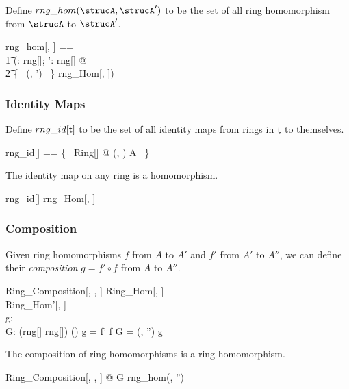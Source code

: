 \documentclass{amsart}
\begin{document}
Define $rng\_hom(\strucA, \strucA')$ to be the set of all ring homomorphism from $\strucA$ to $\strucA'$.

\begin{zed}
	rng\_hom[\genT, \genU] == \\
	\t1	(\lambda \strucA: rng[\genT]; \strucA': rng[\genU] @ \\
	\t2		\{~ (\strucA, \strucA') ~\} \dres rng\_Hom[\genT, \genU])
\end{zed}

\subsubsection{Identity Maps}

Define $rng\_id[\mathsf{t}]$ to be the set of all identity maps from rings in $\mathsf{t}$ to themselves.

\begin{zed}
	rng\_id[\genT] == \{~ Ring[\genT] @ (\strucA, \strucA) \mapsto \id A ~\}
\end{zed}

\begin{remark}
	The identity map on any ring is a homomorphism.
	
\begin{zed}
	rng\_id[\setT] \subseteq rng\_Hom[\setT, \setT]
\end{zed}

\end{remark}

\subsubsection{Composition}

Given ring homomorphisms $f$ from $A$ to $A'$ and $f'$ from $A'$ to $A''$,
we can define their \textit{composition} $g = f' \circ f$ from $A$ to $A''$.

\begin{schema}{Ring\_Composition}[\genT, \genU, \genV]
	Ring\_Hom[\genT, \genU] \\
	Ring\_Hom'[\genU, \genV] \\
	g: \genT \pfun \genV \\
	G: (rng[\genT] \cross rng[\genV]) \cross (\genT \pfun \genV)
\where
	g = f' \circ f
\also
	G = (\strucA, \strucA'') \mapsto g
\end{schema}

\begin{remark}
The composition of ring homomorphisms is a ring homomorphism.

\begin{zed}
	\forall Ring\_Composition[\setT, \setU, \setV] @ G \in rng\_hom(\strucA, \strucA'')
\end{zed}

\end{remark}
\end{document}

